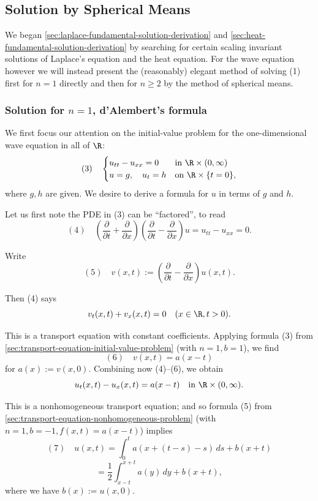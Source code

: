 \subsection{Solution by Spherical Means}
\label{sec:wave-solution-spherical-means}

We began \cref{sec:laplace-fundamental-solution-derivation} and \cref{sec:heat-fundamental-solution-derivation} by searching for certain scaling invariant solutions of Laplace's equation and the heat equation. For the wave equation however we will instead present the (reasonably) elegant method of solving (1) first for $n = 1$ directly and then for $n \geq 2$ by the method of spherical means.

\subsubsection{Solution for $n = 1$, d'Alembert's formula}
\label{sec:wave-dalembert-formula}

We first focus our attention on the initial-value problem for the one-dimensional wave equation in all of $\R$:
$$(3) \quad \begin{cases} u_{tt} - u_{xx} = 0 & \text{in } \R \times (0,\infty) \\ u = g, \quad u_t = h & \text{on } \R \times \{t = 0\}, \end{cases}$$
where $g, h$ are given. We desire to derive a formula for $u$ in terms of $g$ and $h$.

Let us first note the PDE in (3) can be ``factored'', to read
$$(4) \quad \left(\frac{\partial}{\partial t} + \frac{\partial}{\partial x}\right)\left(\frac{\partial}{\partial t} - \frac{\partial}{\partial x}\right)u = u_{tt} - u_{xx} = 0.$$

Write
$$(5) \quad v(x,t) := \left(\frac{\partial}{\partial t} - \frac{\partial}{\partial x}\right)u(x,t).$$

Then (4) says
$$v_t(x,t) + v_x(x,t) = 0 \quad (x \in \R, t > 0).$$

This is a transport equation with constant coefficients. Applying formula (3) from \cref{sec:transport-equation-initial-value-problem} (with $n = 1, b = 1$), we find
$$(6) \quad v(x,t) = a(x - t)$$
for $a(x) := v(x,0)$. Combining now (4)--(6), we obtain
$$u_t(x,t) - u_x(x,t) = a(x - t) \quad \text{in } \R \times (0,\infty).$$

This is a nonhomogeneous transport equation; and so formula (5) from \cref{sec:transport-equation-nonhomogeneous-problem} (with $n = 1, b = -1, f(x,t) = a(x-t)$) implies
$$(7) \quad u(x,t) = \int_0^t a(x + (t - s) - s) \, ds + b(x+t)$$
$$= \frac{1}{2}\int_{x-t}^{x+t} a(y) \, dy + b(x+t),$$
where we have $b(x) := u(x,0)$.

